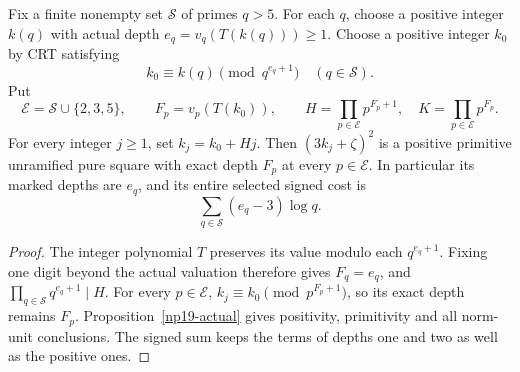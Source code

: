 \begin{theorem}
\label{np19-packet}
Fix a finite nonempty set \(\mathcal S\) of primes \(q>5\).
For each \(q\), choose a positive integer \(k(q)\) with actual
depth \(e_q=v_q(T(k(q)))\ge1\). Choose a positive integer \(k_0\)
by CRT satisfying
\[
 k_0\equiv k(q)\pmod{q^{e_q+1}}\quad(q\in\mathcal S).
\]
Put
\[
 \mathcal E=\mathcal S\cup\{2,3,5\},\qquad
 F_p=v_p(T(k_0)),\qquad
 H=\prod_{p\in\mathcal E}p^{F_p+1},\quad
 K=\prod_{p\in\mathcal E}p^{F_p}.
\]
For every integer \(j\ge1\), set \(k_j=k_0+Hj\).
Then \((3k_j+\zeta)^2\) is a positive primitive unramified pure
square with exact depth \(F_p\) at every \(p\in\mathcal E\).
In particular its marked depths are \(e_q\), and its entire
selected signed cost is
\[
 \sum_{q\in\mathcal S}(e_q-3)\log q.
\]
\end{theorem}
\begin{proof}
The integer polynomial \(T\) preserves its value modulo each
\(q^{e_q+1}\). Fixing one digit beyond the actual valuation
therefore gives \(F_q=e_q\), and
\(\prod_{q\in\mathcal S}q^{e_q+1}\mid H\).
For every \(p\in\mathcal E\),
\(k_j\equiv k_0\pmod{p^{F_p+1}}\), so its exact depth remains
\(F_p\). Proposition~\ref{np19-actual} gives positivity,
primitivity and all norm-unit conclusions. The signed sum keeps
the terms of depths one and two as well as the positive ones.
\end{proof}

